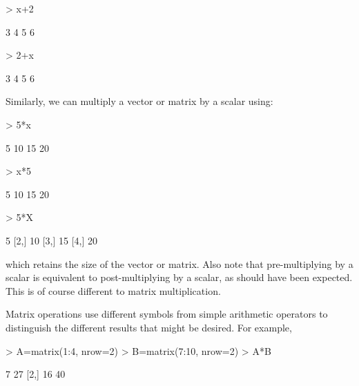 \begin{Schunk}
\begin{Sinput}
> x+2 
\end{Sinput}
\begin{Soutput}
[1] 3 4 5 6
\end{Soutput}
\begin{Sinput}
> 2+x 
\end{Sinput}
\begin{Soutput}
[1] 3 4 5 6
\end{Soutput}
\end{Schunk}

Similarly, we can multiply a vector or matrix by a scalar using: 

\begin{Schunk}
\begin{Sinput}
> 5*x 
\end{Sinput}
\begin{Soutput}
[1]  5 10 15 20
\end{Soutput}
\begin{Sinput}
> x*5 
\end{Sinput}
\begin{Soutput}
[1]  5 10 15 20
\end{Soutput}
\begin{Sinput}
> 5*X 
\end{Sinput}
\begin{Soutput}
     [,1]
[1,]    5
[2,]   10
[3,]   15
[4,]   20
\end{Soutput}
\end{Schunk}

which retains the size of the vector or matrix. Also note that pre-multiplying by a scalar is equivalent to post-multiplying by a scalar, as should have been expected. This is of course different to matrix multiplication. 
 
Matrix operations use different symbols from simple arithmetic operators to distinguish the different results that might be desired. For example, 

\begin{Schunk}
\begin{Sinput}
> A=matrix(1:4, nrow=2) 
> B=matrix(7:10, nrow=2) 
> A*B 
\end{Sinput}
\begin{Soutput}
     [,1] [,2]
[1,]    7   27
[2,]   16   40
\end{Soutput}
\end{Schunk}

